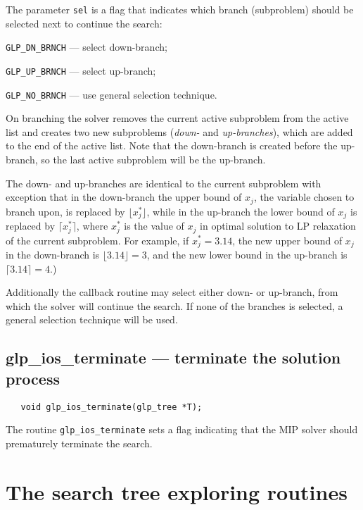The parameter \verb|sel| is a flag that indicates which branch
(subproblem) should be selected next to continue the search:

\verb|GLP_DN_BRNCH| --- select down-branch;

\verb|GLP_UP_BRNCH| --- select up-branch;

\verb|GLP_NO_BRNCH| --- use general selection technique.


On branching the solver removes the current active subproblem from the
active list and creates two new subproblems ({\it down-} and {\it
up-branches}), which are added to the end of the active list. Note that
the down-branch is created before the up-branch, so the last active
subproblem will be the up-branch.

The down- and up-branches are identical to the current subproblem with
exception that in the down-branch the upper bound of $x_j$, the variable
chosen to branch upon, is replaced by $\lfloor x_j^*\rfloor$, while in
the up-branch the lower bound of $x_j$ is replaced by
$\lceil x_j^*\rceil$, where $x_j^*$ is the value of $x_j$ in optimal
solution to LP relaxation of the current subproblem. For example, if
$x_j^*=3.14$, the new upper bound of $x_j$ in the down-branch is
$\lfloor 3.14\rfloor=3$, and the new lower bound in the up-branch is
$\lceil 3.14\rceil=4$.)

Additionally the callback routine may select either down- or up-branch,
from which the solver will continue the search. If none of the branches
is selected, a general selection technique will be used.

\subsection{glp\_ios\_terminate --- terminate the solution process}

\synopsis

\begin{verbatim}
   void glp_ios_terminate(glp_tree *T);
\end{verbatim}

\description

The routine \verb|glp_ios_terminate| sets a flag indicating that the
MIP solver should prematurely terminate the search.


\newpage

\section{The search tree exploring routines}

